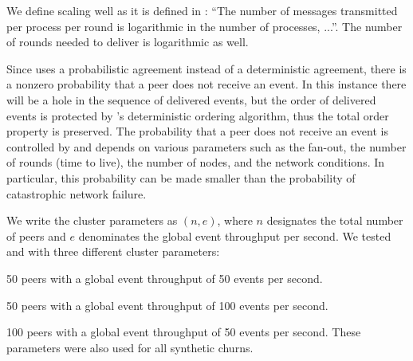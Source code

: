 We define \epto scaling well as it is defined in  \autocite{matos2015epto}:  ``The number
of messages transmitted per process per round is logarithmic
in the number of processes, ...''. The number of rounds needed to deliver is logarithmic as well.  
\par
Since \epto uses a probabilistic agreement instead of a deterministic agreement, there is a nonzero probability that a peer does not receive an event. In this instance there will be a hole in the sequence of delivered events, but the order of delivered events is protected by \epto's deterministic ordering algorithm, thus the total order property is preserved. The probability that a peer does not receive an event is controlled by \epto and depends on various parameters such as the fan-out, the number of rounds (time to live), the number of nodes, and the network conditions. In particular, this probability can be made smaller than the probability of catastrophic network failure. %
\par
We write the cluster parameters as $(n,e)$, where $n$ designates the total number of peers and $e$ denominates the global event throughput per second. We tested \epto and \jgroups with three different cluster parameters:
\begin{description}[\IEEEsetlabelwidth{$(100,100)$:}]
	\item[\textbf{$(50,50)$}:] 50 peers with a global event throughput of 50 events per second.
	\item[\textbf{$(50,100)$}:] 50 peers with a global event throughput of 100 events per second.
	\item[\textbf{$(100,50)$}:] 100 peers with a global event throughput of 50 events per second. These parameters were also used for all synthetic churns.
\end{description}
